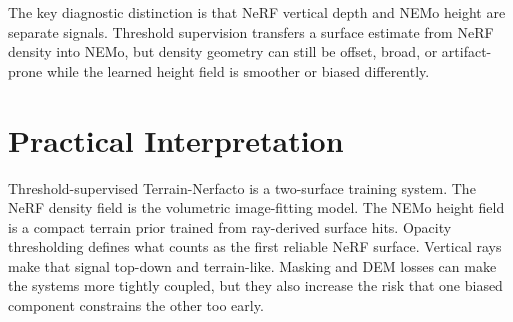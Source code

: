 \documentclass[11pt]{article}
\begin{document}
The key diagnostic distinction is that NeRF vertical depth and NEMo height are separate signals. Threshold supervision transfers a surface estimate from NeRF density into NEMo, but density geometry can still be offset, broad, or artifact-prone while the learned height field is smoother or biased differently.

\section{Practical Interpretation}

Threshold-supervised Terrain-Nerfacto is a two-surface training system. The NeRF density field is the volumetric image-fitting model. The NEMo height field is a compact terrain prior trained from ray-derived surface hits. Opacity thresholding defines what counts as the first reliable NeRF surface. Vertical rays make that signal top-down and terrain-like. Masking and DEM losses can make the systems more tightly coupled, but they also increase the risk that one biased component constrains the other too early.
\end{document}
